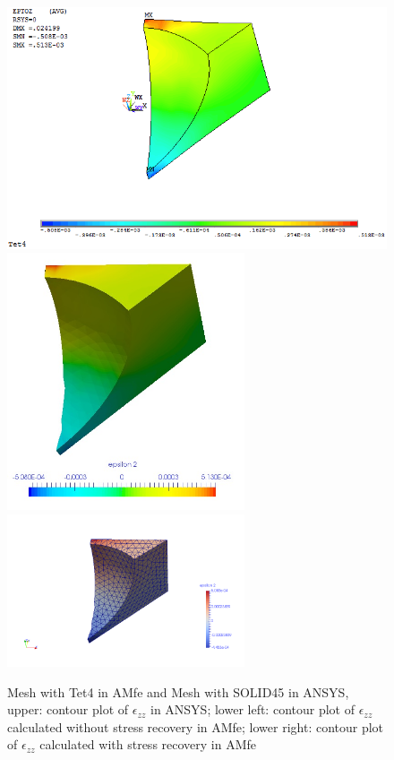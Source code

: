 \begin{figure}[htbp]
	\begin{center}
		\includegraphics[width=13cm,clip]{Tet4Ezz.png} 
		\includegraphics[width=7cm,clip]{Tet4EzzPD.png} 				
		\includegraphics[width=7cm,clip]{Tet4EzzP.png} 		
		\caption{Mesh with Tet4 in AMfe and Mesh with SOLID45 in ANSYS, upper: contour plot of $\epsilon_{zz}$ in ANSYS; lower left: contour plot of $\epsilon_{zz}$ calculated without stress recovery in AMfe; lower right: contour plot of $\epsilon_{zz}$ calculated with stress recovery in AMfe} \label{fig: Tet4_Ezz}
	\end{center}
\end{figure}
\clearpage 


